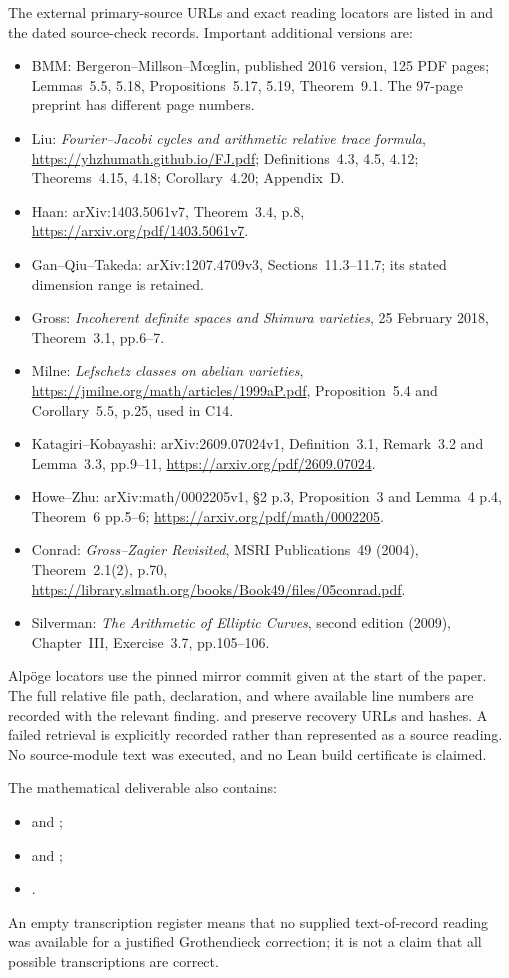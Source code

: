 \documentclass[11pt]{article}
\theoremstyle{definition}\newtheorem{definition}[theorem]{Definition}\newtheorem{remark}[theorem]{Remark}
\begin{document}
The external primary-source URLs and exact reading locators are
listed in  and the
dated source-check records. Important additional versions are:
\begin{itemize}[leftmargin=*]
\item BMM: Bergeron--Millson--M\oe glin, published 2016 version,
125 PDF pages; Lemmas~5.5, 5.18, Propositions~5.17, 5.19,
Theorem~9.1. The 97-page preprint has different page numbers.
\item Liu: \emph{Fourier--Jacobi cycles and arithmetic relative
trace formula}, \url{https://yhzhumath.github.io/FJ.pdf};
Definitions~4.3, 4.5, 4.12; Theorems~4.15, 4.18;
Corollary~4.20; Appendix~D.
\item Haan: arXiv:1403.5061v7, Theorem~3.4, p.8,
\url{https://arxiv.org/pdf/1403.5061v7}.
\item Gan--Qiu--Takeda: arXiv:1207.4709v3,
Sections~11.3--11.7; its stated dimension range is retained.
\item Gross: \emph{Incoherent definite spaces and Shimura varieties},
25 February 2018, Theorem~3.1, pp.6--7.
\item Milne: \emph{Lefschetz classes on abelian varieties},
\url{https://jmilne.org/math/articles/1999aP.pdf},
Proposition~5.4 and Corollary~5.5, p.25, used in C14.
\item Katagiri--Kobayashi: arXiv:2609.07024v1,
Definition~3.1, Remark~3.2 and Lemma~3.3, pp.9--11,
\url{https://arxiv.org/pdf/2609.07024}.
\item Howe--Zhu: arXiv:math/0002205v1,
\S2 p.3, Proposition~3 and Lemma~4 p.4,
Theorem~6 pp.5--6; \url{https://arxiv.org/pdf/math/0002205}.
\item Conrad: \emph{Gross--Zagier Revisited}, MSRI
Publications~49 (2004), Theorem~2.1(2), p.70,
\url{https://library.slmath.org/books/Book49/files/05conrad.pdf}.
\item Silverman: \emph{The Arithmetic of Elliptic Curves},
second edition (2009), Chapter~III, Exercise~3.7,
pp.105--106.
\end{itemize}

Alp\"oge locators use the pinned mirror commit given at the start
of the paper. The full relative file path, declaration, and where
available line numbers are recorded with the relevant finding.
 and
 preserve recovery
URLs and hashes. A failed retrieval is explicitly recorded rather
than represented as a source reading. No source-module text was
executed, and no Lean build certificate is claimed.

The mathematical deliverable also contains:
\begin{itemize}[leftmargin=*]
\item {} and ;
\item {} and ;
\item {}.
\end{itemize}
An empty transcription register means that no
supplied text-of-record reading was available for a justified
Grothendieck correction; it is not a claim that all possible
transcriptions are correct.
\end{document}
